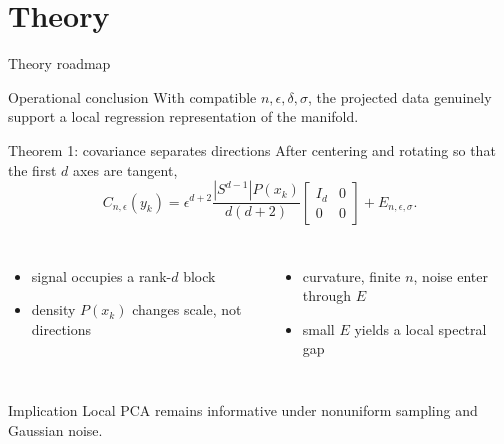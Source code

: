 \documentclass[aspectratio=169,10pt]{beamer}
\begin{document}
\section{Theory}

\begin{frame}{Theory roadmap}
  \begin{center}
  \end{center}
  \vspace{0.35cm}
  \begin{exampleblock}{Operational conclusion}
    With compatible \(n,\epsilon,\delta,\sigma\), the projected data genuinely
    support a local regression representation of the manifold.
  \end{exampleblock}
\end{frame}

\begin{frame}{Theorem 1: covariance separates directions}
  After centering and rotating so that the first \(d\) axes are tangent,
  \[
    C_{n,\epsilon}(y_k)
      =
      \epsilon^{d+2}
      \frac{|S^{d-1}|P(x_k)}{d(d+2)}
      \begin{bmatrix}I_d&0\\0&0\end{bmatrix}
      +E_{n,\epsilon,\sigma}.
  \]
  \begin{columns}[T]
      \begin{itemize}
        \item signal occupies a rank-\(d\) block
        \item density \(P(x_k)\) changes scale, not directions
      \end{itemize}
      \begin{itemize}
        \item curvature, finite \(n\), noise enter through \(E\)
        \item small \(E\) yields a local spectral gap
      \end{itemize}
  \end{columns}
  \begin{alertblock}{Implication}
    Local PCA remains informative under nonuniform sampling and Gaussian noise.
  \end{alertblock}
\end{frame}
\end{document}
